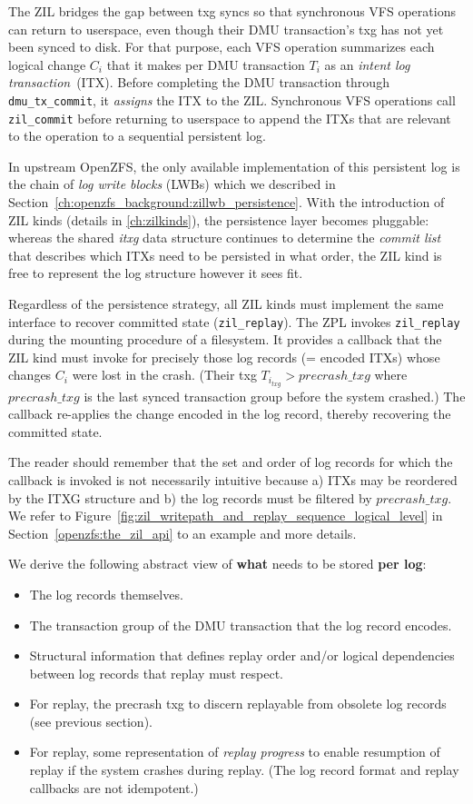 \documentclass[12pt,a4paper,twoside]{book}
\begin{document}
The ZIL bridges the gap between txg syncs so that synchronous VFS operations can return to userspace, even though their DMU transaction's txg has not yet been synced to disk.
For that purpose, each VFS operation summarizes each logical change $C_i$ that it makes per DMU transaction $T_i$ as an \textit{intent log transaction}~(ITX).
Before completing the DMU transaction through \lstinline{dmu_tx_commit}, it \textit{assigns} the ITX to the ZIL.
Synchronous VFS operations call \lstinline{zil_commit} before returning to userspace to append the ITXs that are relevant to the operation to a sequential persistent log.

In upstream OpenZFS, the only available implementation of this persistent log is the chain of \textit{log write blocks} (LWBs) which we described in Section~\ref{ch:openzfs_background:zillwb_persistence}.
With the introduction of ZIL kinds (details in \ref{ch:zilkinds}), the persistence layer becomes pluggable:
whereas the shared \textit{itxg} data structure continues to determine the \textit{commit list} that describes which ITXs need to be persisted in what order, the ZIL kind is free to represent the log structure however it sees fit.

Regardless of the persistence strategy, all ZIL kinds must implement the same interface to recover committed state (\lstinline{zil_replay}).
The ZPL invokes \lstinline{zil_replay} during the mounting procedure of a filesystem.
It provides a callback that the ZIL kind must invoke for precisely those log records (= encoded ITXs) whose changes $C_i$ were lost in the crash.
(Their txg $T_{i_{txg}} > precrash\_txg$ where $precrash\_txg$ is the last synced transaction group before the system crashed.)
The callback re-applies the change encoded in the log record, thereby recovering the committed state.

The reader should remember that the set and order of log records for which the callback is invoked is not necessarily intuitive because
a) ITXs may be reordered by the ITXG structure and b) the log records must be filtered by $precrash\_txg$.
We refer to Figure~\ref{fig:zil_writepath_and_replay_sequence_logical_level} in Section~\ref{openzfs:the_zil_api} to an example and more details.


We derive the following abstract view of \textbf{what} needs to be stored \textbf{per log}:
\begin{itemize}[noitemsep,beginpenalty=100000,midpenalty=100000]
    \item The log records themselves.
    \item The transaction group of the DMU transaction that the log record encodes.
    \item Structural information that defines replay order and/or logical dependencies between log records that replay must respect.
    \item For replay, the precrash txg to discern replayable from obsolete log records (see previous section).
    \item For replay, some representation of \textit{replay progress} to enable resumption of replay if the system crashes during replay.
        (The log record format and replay callbacks are not idempotent.)
\end{itemize}
\end{document}
